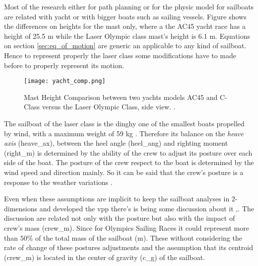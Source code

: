 Most of the research either for path planning or for the physic model for sailboats are related with yacht or with bigger boats such as sailing vessels. Figure shows the differences on heights for the mast only, where a the AC45 yacht race has a height of 25.5 m while the Laser Olympic class mast's height is 6.1 m. Equations on section  \ref{sec:eq_of_motion} are generic an applicable to any kind of sailboat. Hence to represent properly the laser class some modifications have to made before to properly represent its motion.\par 
\begin{figure} [hbt!]
    \centering
    \texttt{[image: yacht\_comp.png]}
    \caption{Mast Height Comparison between two yachts models AC45 and C-Class versus the Laser Olympic Class, side view. \cite{yacht_compw}.}
    \label{fig:yacht_mast_height}
\end{figure}
The sailboat of the laser class is the dinghy one of the smallest boats propelled by wind, with a maximum weight of 59 kg \cite{sailoly}. Therefore its balance on the \textit{heave axis} (\acrshort{heave_ax}), between the heel angle (\acrshort{heel_ang}) and righting moment (\acrshort{right_m}) is determined by the ability of the crew to adjust its posture over each side of the boat. The posture of the crew respect to the boat is determined by the wind speed and direction mainly. So it can be said that the crew's posture is a response to the weather variations \cite{marchajaereo1979}.\par 

Even when these assumptions are implicit to keep the sailboat analyses in 2-dimensions and developed the \acrshort{vpp} there's is being some discussion about it \cite{philpott1993yacht},\cite{larsonprinciples}. The discussion are related not only with the posture but also with the impact of crew's mass (\acrshort{crew_m}). Since for Olympics Sailing Races it could represent more than $50 \% $ of the total mass of the sailboat (\acrshort{m})\cite{day2017performance}. These without considering the rate of change of these postures adjustments and the assumption that its centroid (\acrshort{crew_m}) is located in the center of gravity (\acrshort{c_g}) of the sailboat. \par 


